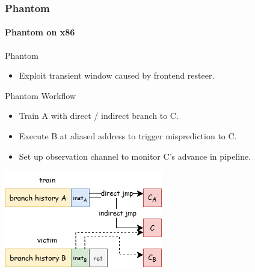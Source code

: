 \documentclass{beamer}
\begin{document}
\begin{frame}
    \frametitle{Phantom}
    \framesubtitle{Phantom on x86}
    \begin{minipage}{0.5\textwidth}
        Phantom
        \begin{itemize}
            \item Exploit transient window caused by frontend resteer.
        \end{itemize}
        
        Phantom Workflow
        \begin{itemize}
            \item Train A with direct / indirect branch to C.
            \item Execute B at aliased address to trigger misprediction to C.
            \item Set up observation channel to monitor C's advance in pipeline.
        \end{itemize}
    \end{minipage}
        \hfill
    \begin{minipage}{0.4\textwidth}
        \includegraphics[width=\textwidth]{Figure/trainning overview.png}
    \end{minipage}    
    
\end{frame}
\end{document}
